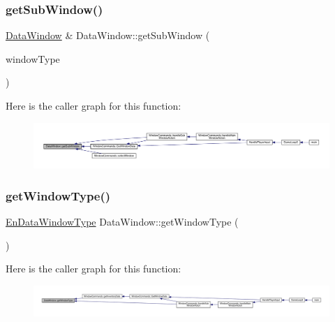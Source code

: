 \subsubsection{\texorpdfstring{get\+Sub\+Window()}{getSubWindow()}}
{\footnotesize\ttfamily \mbox{\hyperlink{class_data_window}{Data\+Window}} \& Data\+Window\+::get\+Sub\+Window (\begin{DoxyParamCaption}\item[{\mbox{\hyperlink{_data_window_8hpp_a3c1e0c6fe947fdbea7502497b27cf44d}{En\+Data\+Window\+Type}}}]{window\+Type }\end{DoxyParamCaption})}

Here is the caller graph for this function\+:
\nopagebreak
\begin{figure}[H]
\begin{center}
\leavevmode
\includegraphics[width=350pt]{class_data_window_ab3ad6b28f3a4c54f692d623b4af48779_icgraph}
\end{center}
\end{figure}
\mbox{\label{class_data_window_a84545c27ad784513eb4f830d4aeda82a}} 
\subsubsection{\texorpdfstring{get\+Window\+Type()}{getWindowType()}}
{\footnotesize\ttfamily \mbox{\hyperlink{_data_window_8hpp_a3c1e0c6fe947fdbea7502497b27cf44d}{En\+Data\+Window\+Type}} Data\+Window\+::get\+Window\+Type (\begin{DoxyParamCaption}{ }\end{DoxyParamCaption})}

Here is the caller graph for this function\+:
\nopagebreak
\begin{figure}[H]
\begin{center}
\leavevmode
\includegraphics[width=350pt]{class_data_window_a84545c27ad784513eb4f830d4aeda82a_icgraph}
\end{center}
\end{figure}
\mbox{\label{class_data_window_afd440dc420c7fdef23a1a52f0f1b40f1}} 

